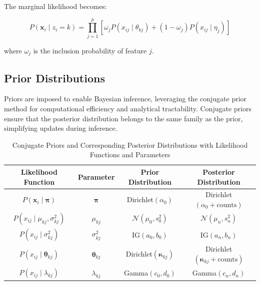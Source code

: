 The marginal likelihood becomes:

\[
P(\mathbf{x}_i \mid z_i = k) = \prod_{j=1}^{p} \left[ \omega_j P(x_{ij} \mid \theta_{kj}) + (1 - \omega_j) P(x_{ij} \mid \eta_j) \right]
\]

where $\omega_j$ is the inclusion probability of feature $j$.

\subsection{Prior Distributions}

Priors are imposed to enable Bayesian inference, leveraging the conjugate prior method for computational efficiency and analytical tractability. Conjugate priors ensure that the posterior distribution belongs to the same family as the prior, simplifying updates during inference.

\begin{table}[h!]
\centering
\begin{tabular}{|c|c|c|c|}
\hline
\textbf{Likelihood Function} & \textbf{Parameter} & \textbf{Prior Distribution} & \textbf{Posterior Distribution} \\ \hline
$P(\mathbf{x}_i \mid \boldsymbol{\pi})$ & $\boldsymbol{\pi}$ & Dirichlet$(\alpha_0)$ & Dirichlet$(\alpha_0 + \text{counts})$ \\ \hline
$P(x_{ij} \mid \mu_{kj}, \sigma^2_{kj})$ & $\mu_{kj}$ & $\mathcal{N}(\mu_0, s_0^2)$ & $\mathcal{N}(\mu_n, s_n^2)$ \\ \hline
$P(x_{ij} \mid \sigma^2_{kj})$ & $\sigma^2_{kj}$ & $\text{IG}(a_0, b_0)$ & $\text{IG}(a_n, b_n)$ \\ \hline
$P(x_{ij} \mid \boldsymbol{\theta}_{kj})$ & $\boldsymbol{\theta}_{kj}$ & Dirichlet$(\boldsymbol{\kappa}_{kj})$ & Dirichlet$(\boldsymbol{\kappa}_{kj} + \text{counts})$ \\ \hline
$P(x_{ij} \mid \lambda_{kj})$ & $\lambda_{kj}$ & Gamma$(c_0, d_0)$ & Gamma$(c_n, d_n)$ \\ \hline
\end{tabular}
\caption{Conjugate Priors and Corresponding Posterior Distributions with Likelihood Functions and Parameters}
\label{tab:conjugate_priors}
\end{table}

